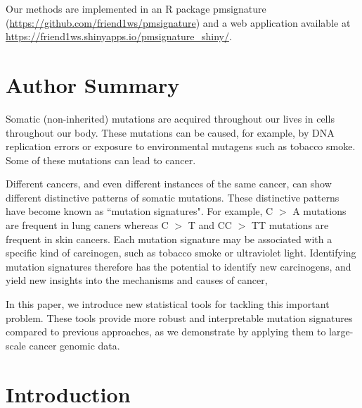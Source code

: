 \documentclass[10pt,letterpaper]{article}
\begin{document}
Our methods are implemented in an R package 
pmsignature (\url{https://github.com/friend1ws/pmsignature})
and a web application available at \url{https://friend1ws.shinyapps.io/pmsignature_shiny/}.


\section*{Author Summary}

Somatic (non-inherited) mutations are acquired throughout our lives in cells throughout our body. These mutations
can be caused, for example, by DNA replication errors or exposure to environmental mutagens such as tobacco smoke. 
Some of these mutations can lead to cancer. 

Different cancers, and even different instances of the same
cancer, can show different distinctive patterns of somatic mutations. These distinctive patterns 
have become known as ``mutation signatures".
For example, C $>$ A mutations are frequent in lung caners
whereas C $>$ T and CC $>$ TT mutations are frequent in skin cancers. Each mutation signature may be associated with a specific kind of carcinogen, such as tobacco smoke or ultraviolet light. Identifying mutation signatures
therefore has the potential to identify new carcinogens, and
yield new insights into the mechanisms and causes of cancer, 

In this paper, we introduce new statistical tools
for tackling this important problem. These tools provide more robust and interpretable mutation signatures compared to previous approaches, as we demonstrate by applying them to large-scale cancer genomic data.

\linenumbers

\section*{Introduction}
\end{document}
